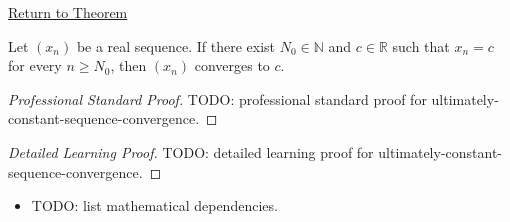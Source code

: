 \newpage
{}
\label{prf:ultimately-constant-sequence-convergence}

\begin{remark*}[Return]
\hyperref[thm:ultimately-constant-sequence-convergence]{Return to Theorem}
\end{remark*}

\begin{theorem*}
Let $(x_n)$ be a real sequence. If there exist $N_0 \in \mathbb{N}$ and
$c \in \mathbb{R}$ such that $x_n = c$ for every $n \ge N_0$, then
$(x_n)$ converges to $c$.

\smallskip
\noindent
\end{theorem*}

\begin{proof}[Professional Standard Proof]
\LRAProofBodyStart
TODO: professional standard proof for ultimately-constant-sequence-convergence.
\end{proof}

\begin{proof}[Detailed Learning Proof]
\LRAProofBodyStart
TODO: detailed learning proof for ultimately-constant-sequence-convergence.
\end{proof}

\begin{remark*}
\end{remark*}

\begin{dependencies}
\begin{itemize}
  \item TODO: list mathematical dependencies.
\end{itemize}
\end{dependencies}

\clearpage
